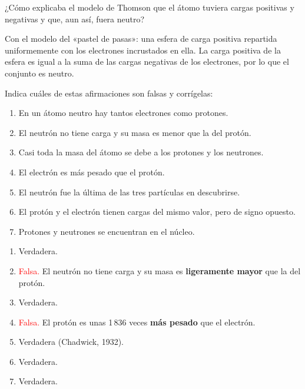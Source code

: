 \begin{exercise}
    ¿Cómo explicaba el modelo de Thomson que el átomo tuviera cargas positivas y negativas y que, aun así, fuera neutro?
    \begin{solu}
        Con el modelo del «pastel de pasas»: una esfera de carga positiva repartida uniformemente con los electrones incrustados en ella. La carga positiva de la esfera es igual a la suma de las cargas negativas de los electrones, por lo que el conjunto es neutro.
    \end{solu}
\end{exercise}

\begin{exercise}
    Indica cuáles de estas afirmaciones son falsas y corrígelas:
    \begin{enumerate}[label=\alph*)]
        \item En un átomo neutro hay tantos electrones como protones.
        \item El neutrón no tiene carga y su masa es menor que la del protón.
        \item Casi toda la masa del átomo se debe a los protones y los neutrones.
        \item El electrón es más pesado que el protón.
        \item El neutrón fue la última de las tres partículas en descubrirse.
        \item El protón y el electrón tienen cargas del mismo valor, pero de signo opuesto.
        \item Protones y neutrones se encuentran en el núcleo.
    \end{enumerate}
    \begin{solu}
        \begin{enumerate}[label=\alph*)]
            \item Verdadera.
            \item \textcolor{red}{Falsa.} El neutrón no tiene carga y su masa es \textbf{ligeramente mayor} que la del protón.
            \item Verdadera.
            \item \textcolor{red}{Falsa.} El protón es unas 1\,836 veces \textbf{más pesado} que el electrón.
            \item Verdadera (Chadwick, 1932).
            \item Verdadera.
            \item Verdadera.
        \end{enumerate}
    \end{solu}
\end{exercise}

